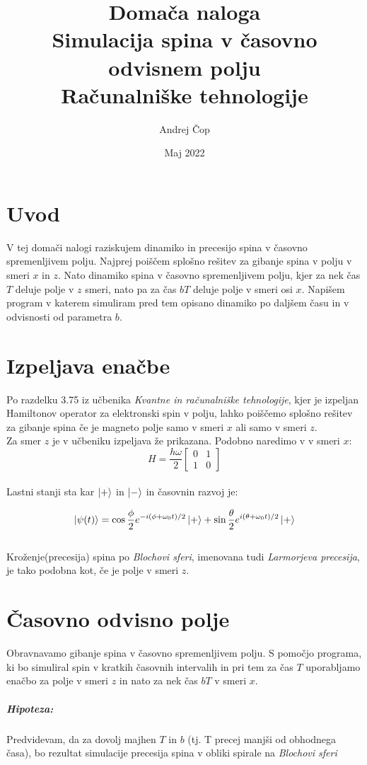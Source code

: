 \documentclass[12pt, a4paper]{article}
\title{  Domača naloga\\\large\textbf{Simulacija spina v časovno odvisnem polju}\\
\large Računalniške tehnologije}
\author{Andrej Čop}
\date{Maj 2022}
\begin{document}
\maketitle
\newpage

\tableofcontents
\newpage

\section{Uvod}
V tej domači nalogi raziskujem dinamiko in precesijo spina v časovno spremenljivem polju. Najprej poiščem splošno rešitev za gibanje spina v polju v smeri $x$ in $z$. Nato dinamiko spina v časovno spremenljivem polju, kjer za nek čas $T$ deluje polje v $z$ smeri, nato pa za čas $bT$ deluje polje v smeri osi $x$. Napišem program v katerem simuliram pred tem opisano dinamiko po daljšem času in v odvisnosti od parametra $b$.
\section{Izpeljava enačbe}
Po razdelku 3.75 iz učbenika \textit{Kvantne in računalniške tehnologije}, kjer je izpeljan Hamiltonov operator za elektronski spin v polju, lahko poiščemo splošno rešitev za gibanje spina če je magneto polje samo v smeri $x$ ali samo v smeri $z$.\\
Za smer $z$ je v učbeniku izpeljava že prikazana. Podobno naredimo v v smeri $x$:\\
\begin{equation}
H = \frac{h\omega}{2}
\begin{bmatrix}
0 & 1\\
1 & 0
\end{bmatrix}
\end{equation}\\
Lastni stanji sta kar $\ket{+}$ in $\ket{-}$ in časovnin razvoj je:


\begin{equation}
\ket{\psi(t)} = \cos\frac{\phi}{2}e^{-i(\phi+\omega_0 t)/2}\ket{+} + \sin\frac{\theta}{2}e^{i(\theta+\omega_0 t)/2}\ket{+}
\end{equation}\\
Kroženje(precesija) spina po \textit{Blochovi sferi}, imenovana tudi \textit{Larmorjeva precesija}, je tako podobna kot, če je polje v smeri $z$.

\section{Časovno odvisno polje}
Obravnavamo gibanje spina v časovno spremenljivem polju. S pomočjo programa, ki bo simuliral spin v kratkih časovnih intervalih in pri tem za čas $T$ uporabljamo enačbo za polje v smeri $z$ in nato za nek čas $bT$ v smeri $x$. 
\subparagraph{Hipoteza:}
Predvidevam, da za dovolj majhen $T$ in $b$ (tj. T precej manjši od obhodnega časa), bo rezultat simulacije precesija spina v obliki spirale na \textit{Blochovi sferi}
\end{document}
